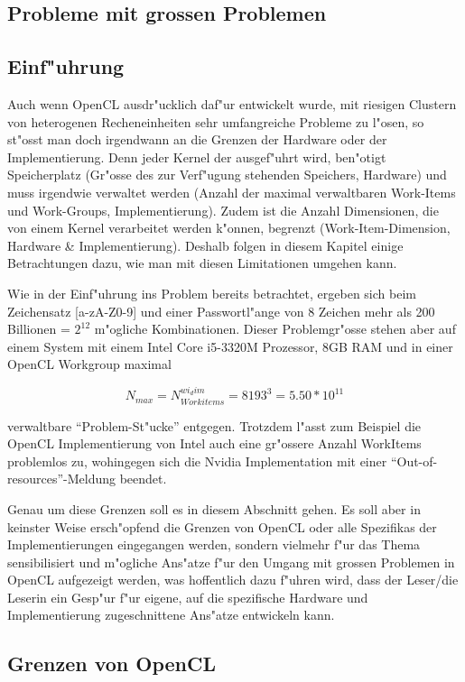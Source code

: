 \begin{refsection}
\section{Probleme mit grossen Problemen}

\subsection{Einf"uhrung}

Auch wenn OpenCL ausdr"ucklich daf"ur entwickelt wurde, mit riesigen Clustern
von heterogenen Recheneinheiten sehr umfangreiche Probleme zu l"osen, so st"osst
man doch irgendwann an die Grenzen der Hardware oder der Implementierung.  Denn
jeder Kernel der ausgef"uhrt wird, ben"otigt Speicherplatz (Gr"osse des zur
Verf"ugung stehenden Speichers, Hardware) und muss irgendwie verwaltet werden
(Anzahl der maximal verwaltbaren Work-Items und Work-Groups, Implementierung).
Zudem ist die Anzahl Dimensionen, die von einem Kernel verarbeitet werden k"onnen,
begrenzt (Work-Item-Dimension, Hardware \& Implementierung). Deshalb folgen in
diesem Kapitel einige Betrachtungen dazu, wie man mit diesen Limitationen
umgehen kann.

Wie in der Einf"uhrung ins Problem bereits betrachtet, ergeben sich beim Zeichensatz
[a-zA-Z0-9] und einer Passwortl"ange von 8 Zeichen mehr als 200 Billionen = $2^{12}$ 
m"ogliche Kombinationen. Dieser Problemgr"osse stehen aber auf einem System mit einem 
Intel Core i5-3320M Prozessor, 8GB RAM und in einer OpenCL Workgroup maximal

\[
 N_{max} = N_{Workitems}^{wi_dim} = 8193^{3} = 5.50 * 10^{11}
\]

verwaltbare ``Problem-St"ucke'' entgegen. Trotzdem l"asst zum Beispiel die OpenCL
Implementierung von Intel auch eine gr"ossere Anzahl WorkItems problemlos zu, 
wohingegen sich die Nvidia Implementation mit einer ``Out-of-resources''-Meldung 
beendet.

Genau um diese Grenzen soll es in diesem Abschnitt gehen. Es soll aber in keinster
Weise ersch"opfend die Grenzen von OpenCL oder alle Spezifikas der 
Implementierungen eingegangen werden, sondern vielmehr f"ur das Thema sensibilisiert 
und m"ogliche Ans"atze f"ur den Umgang mit grossen Problemen in OpenCL aufgezeigt
werden, was hoffentlich dazu f"uhren wird, dass der Leser/die Leserin ein Gesp"ur 
f"ur eigene, auf die spezifische Hardware und Implementierung zugeschnittene 
Ans"atze entwickeln kann.


\subsection{Grenzen von OpenCL}


\end{refsection}
